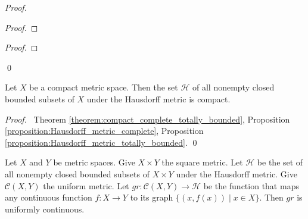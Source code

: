 \begin{proof}
    \pf
    \begin{proof}
    \end{proof}
    \begin{proof}
    \end{proof}
    \qed
\end{proof}

\begin{theorem}
    Let $X$ be a compact metric space. Then the set $\mathcal{H}$ of all nonempty closed bounded subsets of $X$ under the Hausdorff metric
    is compact.
\end{theorem}

\begin{proof}
    \pf\ Theorem \ref{theorem:compact_complete_totally_bounded},
    Proposition \ref{proposition:Hausdorff_metric_complete},
    Proposition \ref{proposition:Hausdorff_metric_totally_bounded}.
    \qed
\end{proof}

\begin{proposition}
    Let $X$ and $Y$ be metric spaces. Give $X \times Y$ the square metric. Let $\mathcal{H}$ be the set of all nonempty closed bounded
    subsets of $X \times Y$ under the Hausdorff metric. Give $\mathcal{C}(X,Y)$ the uniform metric. Let $gr : \mathcal{C}(X,Y) \rightarrow
    \mathcal{H}$ be the function that maps any continuous function $f : X \rightarrow Y$ to its graph $\{ (x, f(x)) \mid x \in X \}$.
    Then $gr$ is uniformly continuous.
\end{proposition}

